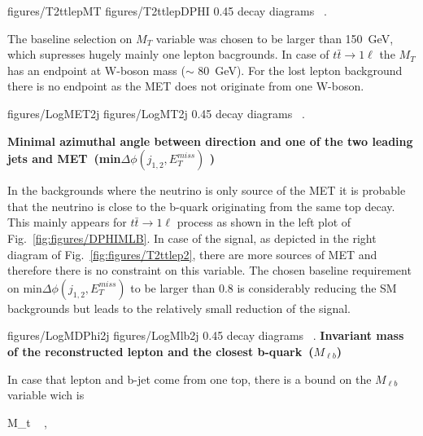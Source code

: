                  {figures/T2ttlepMT} %
                 {figures/T2ttlepDPHI} %
                 {0.45}       %
                 { decay diagrams ~\cite{website:SUSYdiagrams}. }

The baseline selection on  $M_{T}$ variable was chosen to be  larger than 150~GeV, which supresses hugely mainly one lepton bacgrounds. In case of $t \bar{t} \to 1\ell $ the $M_{T}$ has an endpoint at W-boson mass ($\sim$ 80~GeV). %
For the lost lepton background there is no endpoint as the MET does not originate from one W-boson.


                 {figures/LogMET2j} %
                 {figures/LogMT2j} %
                 {0.45}       %
                 { decay diagrams ~\cite{website:SUSYdiagrams}. }

\textbf{Minimal azimuthal angle between direction and  one of the two leading jets and MET~(min$\Delta \phi (j_{1,2}, E_{T}^{miss})$ )}

In the backgrounds where the neutrino is only source of the MET it is probable that the neutrino is close to the b-quark  originating from the same top decay. This mainly appears for $t\bar{t} \to 1\ell$ process as shown in the left plot of Fig.~\ref{fig:figures/DPHIMLB}. In case of the signal, as depicted in the right diagram of Fig.~\ref{fig:figures/T2ttlep2}, there are more sources of MET and therefore there is no constraint on this variable. The chosen baseline requirement on min$\Delta \phi (j_{1,2}, E_{T}^{miss})$ to be larger than 0.8 is considerably reducing the SM backgrounds but leads to the relatively small reduction of the signal.

                 {figures/LogMDPhi2j} %
                 {figures/LogMlb2j} %
                 {0.45}       %
                 { decay diagrams ~\cite{website:SUSYdiagrams}. }
\textbf{Invariant mass of the reconstructed lepton and the closest b-quark~($M_{\ell b}$)}

In case that lepton and b-jet come from one top, there is a bound on the $M_{\ell b}$ variable wich is

{
 M_{t}  ~ ,
}

